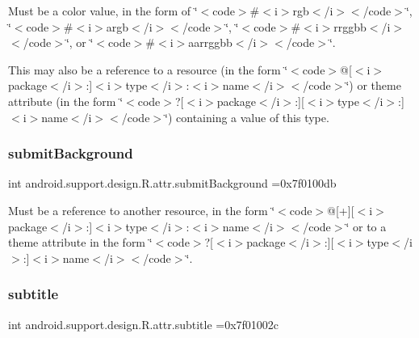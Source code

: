 Must be a color value, in the form of \char`\"{}$<$code$>$\#$<$i$>$rgb$<$/i$>$$<$/code$>$\char`\"{}, \char`\"{}$<$code$>$\#$<$i$>$argb$<$/i$>$$<$/code$>$\char`\"{}, \char`\"{}$<$code$>$\#$<$i$>$rrggbb$<$/i$>$$<$/code$>$\char`\"{}, or \char`\"{}$<$code$>$\#$<$i$>$aarrggbb$<$/i$>$$<$/code$>$\char`\"{}. 

This may also be a reference to a resource (in the form \char`\"{}$<$code$>$@\mbox{[}$<$i$>$package$<$/i$>$\+:\mbox{]}$<$i$>$type$<$/i$>$\+:$<$i$>$name$<$/i$>$$<$/code$>$\char`\"{}) or theme attribute (in the form \char`\"{}$<$code$>$?\mbox{[}$<$i$>$package$<$/i$>$\+:\mbox{]}\mbox{[}$<$i$>$type$<$/i$>$\+:\mbox{]}$<$i$>$name$<$/i$>$$<$/code$>$\char`\"{}) containing a value of this type. \mbox{\label{classandroid_1_1support_1_1design_1_1R_1_1attr_aed7a9a95b5ca3a84d2d0d0b5d7cba82b}} 
\subsubsection{\texorpdfstring{submit\+Background}{submitBackground}}
{\footnotesize\ttfamily int android.\+support.\+design.\+R.\+attr.\+submit\+Background =0x7f0100db\hspace{0.3cm}{\ttfamily [static]}}

Must be a reference to another resource, in the form \char`\"{}$<$code$>$@\mbox{[}+\mbox{]}\mbox{[}$<$i$>$package$<$/i$>$\+:\mbox{]}$<$i$>$type$<$/i$>$\+:$<$i$>$name$<$/i$>$$<$/code$>$\char`\"{} or to a theme attribute in the form \char`\"{}$<$code$>$?\mbox{[}$<$i$>$package$<$/i$>$\+:\mbox{]}\mbox{[}$<$i$>$type$<$/i$>$\+:\mbox{]}$<$i$>$name$<$/i$>$$<$/code$>$\char`\"{}. \mbox{\label{classandroid_1_1support_1_1design_1_1R_1_1attr_a977d337b4627b48ff54cc6b947c7e7ca}} 
\subsubsection{\texorpdfstring{subtitle}{subtitle}}
{\footnotesize\ttfamily int android.\+support.\+design.\+R.\+attr.\+subtitle =0x7f01002c\hspace{0.3cm}{\ttfamily [static]}}

